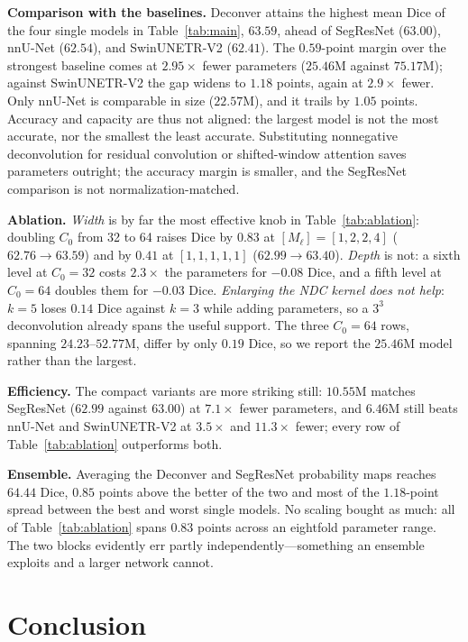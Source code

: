 \documentclass[runningheads,a4paper]{llncs}
\begin{document}
\noindent\textbf{Comparison with the baselines.} Deconver attains the highest mean Dice of the four single models in Table~\ref{tab:main}, $63.59$, ahead of SegResNet ($63.00$), nnU-Net ($62.54$), and SwinUNETR-V2 ($62.41$). The $0.59$-point margin over the strongest baseline comes at $2.95\times$ fewer parameters ($25.46$M against $75.17$M); against SwinUNETR-V2 the gap widens to $1.18$ points, again at $2.9\times$ fewer. Only nnU-Net is comparable in size ($22.57$M), and it trails by $1.05$ points. Accuracy and capacity are thus not aligned: the largest model is not the most accurate, nor the smallest the least accurate. Substituting nonnegative deconvolution for residual convolution or shifted-window attention saves parameters outright; the accuracy margin is smaller, and the SegResNet comparison is not normalization-matched.

\noindent\textbf{Ablation.} \emph{Width} is by far the most effective knob in Table~\ref{tab:ablation}: doubling $C_0$ from 32 to 64 raises Dice by $0.83$ at $[M_\ell]{=}[1,2,2,4]$ ($62.76\!\rightarrow\!63.59$) and by $0.41$ at $[1,1,1,1,1]$ ($62.99\!\rightarrow\!63.40$). \emph{Depth} is not: a sixth level at $C_0{=}32$ costs $2.3\times$ the parameters for $-0.08$ Dice, and a fifth level at $C_0{=}64$ doubles them for $-0.03$ Dice. \emph{Enlarging the NDC kernel does not help}: $k{=}5$ loses $0.14$ Dice against $k{=}3$ while adding parameters, so a $3^3$ deconvolution already spans the useful support. The three $C_0{=}64$ rows, spanning $24.23$--$52.77$M, differ by only $0.19$ Dice, so we report the $25.46$M model rather than the largest.

\noindent\textbf{Efficiency.} The compact variants are more striking still: $10.55$M matches SegResNet ($62.99$ against $63.00$) at $7.1\times$ fewer parameters, and $6.46$M still beats nnU-Net and SwinUNETR-V2 at $3.5\times$ and $11.3\times$ fewer; every row of Table~\ref{tab:ablation} outperforms both.

\noindent\textbf{Ensemble.} Averaging the Deconver and SegResNet probability maps reaches $64.44$ Dice, $0.85$ points above the better of the two and most of the $1.18$-point spread between the best and worst single models. No scaling bought as much: all of Table~\ref{tab:ablation} spans $0.83$ points across an eightfold parameter range. The two blocks evidently err partly independently---something an ensemble exploits and a larger network cannot.

\section{Conclusion}
\end{document}

